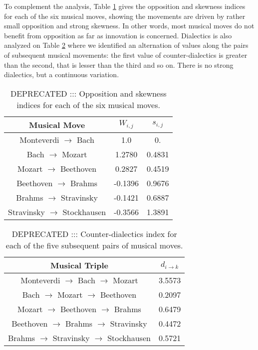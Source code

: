 \documentclass[
 aip,
 jmp,
 amsmath,amssymb,
 reprint,
]{revtex4-1}
\begin{document}
To complement the analysis, Table \ref{tab:tableOI} gives the
opposition and skewness indices for each of the six musical moves,
showing the movements are driven by rather small opposition and strong
skewness. In other words, most musical moves do not benefit from
opposition as far as innovation is concerned. Dialectics is also analyzed on Table
\ref{tab:tableE} where we identified an alternation of values along
the pairs of subsequent musical movements: the first value of
counter-dialectics is greater than the second, that is lesser than the
third and so on. There is no strong
dialectics, but a continuous variation.

\begin{table}[ht]
\caption{\label{tab:tableOI}DEPRECATED ::: Opposition and skewness indices for each
of the six musical moves.}

\begin{tabular}{|c||c|c|}
\hline
Musical Move & $W_{i,j}$ & $s_{i,j}$ \\
\hline \hline

 Monteverdi $\to$ Bach             &   1.0     &  0.      \\
 Bach $\to$ Mozart                 &   1.2780  &  0.4831  \\
 Mozart $\to$ Beethoven            &   0.2827  &  0.4519  \\
 Beethoven $\to$ Brahms            &  -0.1396  &  0.9676  \\
 Brahms $\to$ Stravinsky           &  -0.1421  &  0.6887  \\
 Stravinsky $\to$ Stockhausen      &  -0.3566  &  1.3891  \\

\hline
\end{tabular}
\end{table}

\begin{table}[ht]
\caption{\label{tab:tableE} DEPRECATED ::: Counter-dialectics index for each
of the five subsequent pairs of musical moves.}

\begin{tabular}{|c||c|}
\hline
Musical Triple & $d_{i \rightarrow k}$ \\
\hline \hline

 Monteverdi $\to$ Bach $\to$ Mozart          &     3.5573  \\
 Bach $\to$ Mozart $\to$ Beethoven           &     0.2097  \\
 Mozart $\to$ Beethoven $\to$ Brahms         &     0.6479  \\
 Beethoven $\to$ Brahms $\to$ Stravinsky     &     0.4472  \\
 Brahms $\to$ Stravinsky $\to$ Stockhausen   &     0.5721  \\

\hline
\end{tabular}
\end{table}
\end{document}

